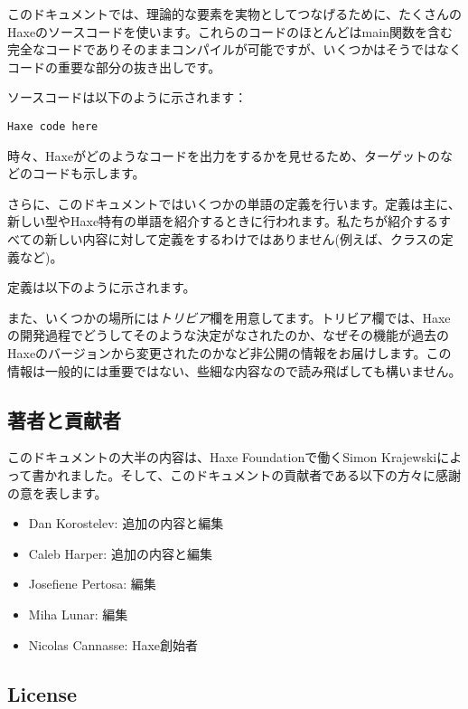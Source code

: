 このドキュメントでは、理論的な要素を実物としてつなげるために、たくさんのHaxeのソースコードを使います。これらのコードのほとんどはmain関数を含む完全なコードでありそのままコンパイルが可能ですが、いくつかはそうではなくコードの重要な部分の抜き出しです。

ソースコードは以下のように示されます：

\begin{lstlisting}
Haxe code here
\end{lstlisting}

時々、Haxeがどのようなコードを出力をするかを見せるため、ターゲットのなどのコードも示します。

さらに、このドキュメントではいくつかの単語の定義を行います。定義は主に、新しい型やHaxe特有の単語を紹介するときに行われます。私たちが紹介するすべての新しい内容に対して定義をするわけではありません(例えば、クラスの定義など)。

定義は以下のように示されます。


また、いくつかの場所には\emph{トリビア}欄を用意してます。トリビア欄では、Haxeの開発過程でどうしてそのような決定がなされたのか、なぜその機能が過去のHaxeのバージョンから変更されたのかなど非公開の情報をお届けします。この情報は一般的には重要ではない、些細な内容なので読み飛ばしても構いません。


\subsection{著者と貢献者}
\label{introduction-authors-and-contributions}

このドキュメントの大半の内容は、Haxe Foundationで働くSimon Krajewskiによって書かれました。そして、このドキュメントの貢献者である以下の方々に感謝の意を表します。

\begin{itemize}
	\item Dan Korostelev: 追加の内容と編集
	\item Caleb Harper: 追加の内容と編集
	\item Josefiene Pertosa: 編集
	\item Miha Lunar: 編集
	\item Nicolas Cannasse: Haxe創始者
\end{itemize}

\subsection{License}
\label{introduction-license}

